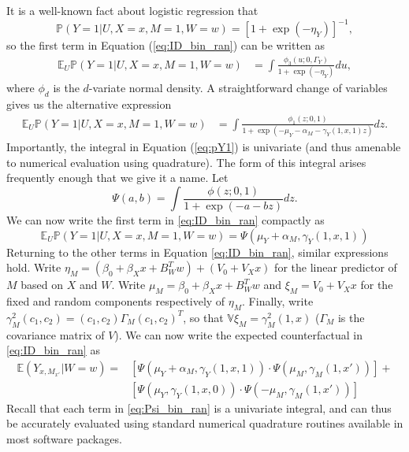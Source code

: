 \documentclass{article}
\newcommand{\bP}{\mathbb{P}}
\newcommand{\bE}{\mathbb{E}}
\newcommand{\bV}{\mathbb{V}}
\begin{document}
It is a well-known fact about logistic regression that
%
\begin{equation}
    \bP \left( Y=1 |U, X=x, M=1, W=w \right) = \left[1 + \exp(-\eta_Y)\right]^{-1},
\end{equation}
%
so the first term in Equation (\ref{eq:ID_bin_ran}) can be written as
%
\begin{align}
    \bE_U \bP \left( Y=1 |U, X=x, M=1, W=w \right) & = \int \frac{\phi_3(u; 0, \Gamma_Y)}{1 + \exp(-\eta_Y)} du, \label{eq:pY1_bad}
\end{align}
%
where $\phi_d$ is the $d$-variate normal density. A straightforward change of variables gives us the alternative expression
%
\begin{align}
    \bE_U \bP \left( Y=1 |U, X=x, M=1, W=w \right) & = \int \frac{\phi_1(z; 0, 1)}{1 + \exp(-\mu_Y - \alpha_M - \gamma_Y(1, x, 1) z)} dz. \label{eq:pY1}
\end{align}
%
Importantly, the integral in Equation (\ref{eq:pY1}) is univariate (and thus amenable to numerical evaluation using quadrature). The form of this integral arises frequently enough that we give it a name. Let
%
\begin{equation}
    \Psi(a, b) = \int \frac{\phi(z; 0, 1)}{1 + \exp(-a - b z)} dz.
\end{equation}
%
We can now write the first term in \eqref{eq:ID_bin_ran} compactly as
%
\begin{equation}
    \bE_U \bP \left( Y=1 |U, X=x, M=1, W=w \right) = \Psi(\mu_Y + \alpha_M, \gamma_Y(1, x, 1))
\end{equation}
%
Returning to the other terms in Equation \eqref{eq:ID_bin_ran}, similar expressions hold. Write $\eta_M = (\beta_0 + \beta_X x + B_W^T w) + (V_0 + V_X x)$ for the linear predictor of $M$ based on $X$ and $W$. Write $\mu_M = \beta_0 + \beta_X x + B_W^T w$ and $\xi_M = V_0 + V_X x$ for the fixed and random components respectively of $\eta_M$. Finally, write $\gamma^2_M(c_1, c_2) = (c_1, c_2) \Gamma_M (c_1, c_2)^T$, so that $\bV \xi_M = \gamma^2_M(1, x)$ ($\Gamma_M$ is the covariance matrix of $V$). We can now write the expected counterfactual in \eqref{eq:ID_bin_ran} as
%
\begin{align}
    \bE (Y_{x, M_{x'}} | W=w) = & \left[  \Psi(\mu_Y + \alpha_M, \gamma_Y(1, x, 1)) \cdot \Psi(\mu_M , \gamma_M(1, x')) \right] + \label{eq:Psi_bin_ran}\\
    & \left[ \Psi(\mu_Y, \gamma_Y(1, x, 0)) \cdot \Psi(- \mu_M , \gamma_M(1, x')) \right] \nonumber
\end{align}
%
Recall that each term in \eqref{eq:Psi_bin_ran} is a univariate integral, and can thus be accurately evaluated using standard numerical quadrature routines available in most software packages.
\end{document}
